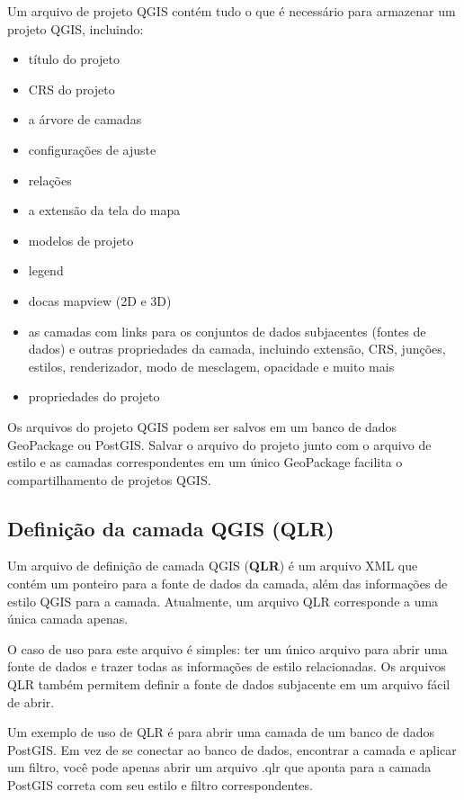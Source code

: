 \documentclass[
  portuguese,
]{krantz}
\providecommand{\tightlist}{%
  \setlength{\itemsep}{0pt}\setlength{\parskip}{0pt}}
\begin{document}
Um arquivo de projeto QGIS contém tudo o que é necessário para armazenar um projeto QGIS, incluindo:

\begin{itemize}
\tightlist
\item
  título do projeto
\item
  CRS do projeto
\item
  a árvore de camadas
\item
  configurações de ajuste
\item
  relações
\item
  a extensão da tela do mapa
\item
  modelos de projeto
\item
  legend
\item
  docas mapview (2D e 3D)
\item
  as camadas com links para os conjuntos de dados subjacentes (fontes de dados) e outras propriedades da camada, incluindo extensão, CRS, junções, estilos, renderizador, modo de mesclagem, opacidade e muito mais
\item
  propriedades do projeto
\end{itemize}

Os arquivos do projeto QGIS podem ser salvos em um banco de dados GeoPackage ou PostGIS. Salvar o arquivo do projeto junto com o arquivo de estilo e as camadas correspondentes em um único GeoPackage facilita o compartilhamento de projetos QGIS.

\hypertarget{definiuxe7uxe3o-da-camada-qgis-qlr}{%
\subsection{\texorpdfstring{\textbf{Definição da camada QGIS (QLR)}}{Definição da camada QGIS (QLR)}}\label{definiuxe7uxe3o-da-camada-qgis-qlr}}

Um arquivo de definição de camada QGIS (\textbf{QLR}) é um arquivo XML que contém um ponteiro para a fonte de dados da camada, além das informações de estilo QGIS para a camada. Atualmente, um arquivo QLR corresponde a uma única camada apenas.

O caso de uso para este arquivo é simples: ter um único arquivo para abrir uma fonte de dados e trazer todas as informações de estilo relacionadas. Os arquivos QLR também permitem definir a fonte de dados subjacente em um arquivo fácil de abrir.

Um exemplo de uso de QLR é para abrir uma camada de um banco de dados PostGIS. Em vez de se conectar ao banco de dados, encontrar a camada e aplicar um filtro, você pode apenas abrir um arquivo .qlr que aponta para a camada PostGIS correta com seu estilo e filtro correspondentes.
\end{document}
